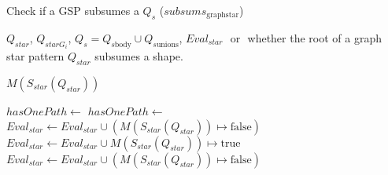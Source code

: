 \begin{algorithm}[h]
    \caption{Check if a GSP subsumes a $Q_s$ ($subsums_{\mathrm{graph star}}$)}\label{alg:containmentTree}
    \begin{algorithmic}[1]
       \scriptsize
 
       \REQUIRE  $Q_{star}$, $Q_{starG_i}$, $Q_s = Q_{s\mathrm{body}} \cup Q_{s\mathrm{unions}}$, $Eval_{star}$
       \ENSURE \TRUE $ $ or \FALSE $ $ whether the root of a graph star pattern $Q_{star}$ subsumes a shape.
 
          \RETURN $M(S_{star}(Q_{star}))$
       \ENDIF 
 
             \STATE $hasOnePath \gets $ \FALSE
                   \STATE $hasOnePath \gets $ \TRUE
                \ENDIF
             \ENDFOR
             \STATE $Eval_{star} \gets Eval_{star} \cup (M(S_{star}(Q_{star})) \mapsto \mathrm{false})$
                \RETURN \FALSE
             \ENDIF
          \ELSE
               \STATE $Eval_{star} \gets Eval_{star} \cup M(S_{star}(Q_{star})) \mapsto \mathrm{true}$
                  \STATE $Eval_{star} \gets Eval_{star} \cup (M(S_{star}(Q_{star})) \mapsto \mathrm{false})$
                   \RETURN \FALSE
                \ENDIF
             \ENDIF
          \ENDIF
       \ENDFOR
 
       \RETURN \TRUE
    \end{algorithmic}
 \end{algorithm}